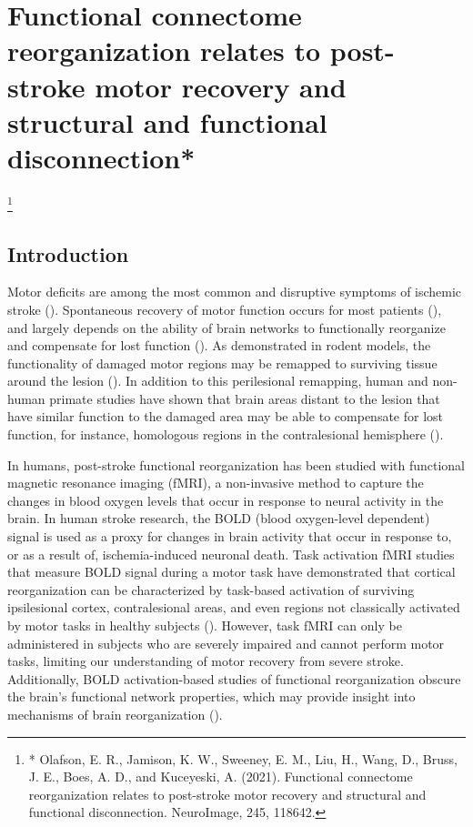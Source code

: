 \documentclass[phd,tocprelim]{cornell}
\newcommand\blfootnote[1]{%
  \begingroup
  \renewcommand\thefootnote{}\footnote{#1}%
  \addtocounter{footnote}{-1}%
  \endgroup
}
\begin{document}
\chapter{Functional connectome reorganization relates to post-stroke motor recovery and structural and functional disconnection*}
\blfootnote{* Olafson, E. R., Jamison, K. W., Sweeney, E. M., Liu, H., Wang, D., Bruss, J. E., Boes, A. D., and Kuceyeski, A. (2021). Functional connectome reorganization relates to post-stroke motor recovery and structural and functional disconnection. NeuroImage, 245, 118642.}

%
\section{Introduction}
Motor deficits are among the most common and disruptive symptoms of ischemic stroke (\cite{Kelly-Hayes2003-sp}). Spontaneous recovery of motor function occurs for most patients (\cite{Duncan2000-uj}), and largely depends on the ability of brain networks to functionally reorganize and compensate for lost function (\cite{Grefkes2008-bt, Rehme2013-ap}). As demonstrated in rodent models, the functionality of damaged motor regions may be remapped to surviving tissue around the lesion (\cite{Winship2009-af,Brown2009-jn}).  In addition to this perilesional remapping, human and non-human primate studies have shown that brain areas distant to the lesion that have similar function to the damaged area may be able to compensate for lost function, for instance, homologous regions in the contralesional hemisphere (\cite{Murata2015-ss, Ward2003-zd, Cramer1997-ko,Cao1998-iq}).  

In humans, post-stroke functional reorganization has been studied with functional magnetic resonance imaging (fMRI), a non-invasive method to capture the changes in blood oxygen levels that occur in response to neural activity in the brain. In human stroke research, the BOLD (blood oxygen-level dependent) signal is used as a proxy for changes in brain activity that occur in response to, or as a result of, ischemia-induced neuronal death. Task activation fMRI studies that measure BOLD signal during a motor task have demonstrated that cortical reorganization can be characterized by task-based activation of surviving ipsilesional cortex, contralesional areas, and even regions not classically activated by motor tasks in healthy subjects (\cite{Ward2003-zd,Park2011-kx}). However, task fMRI can only be administered in subjects who are severely impaired and cannot perform motor tasks, limiting our understanding of motor recovery from severe stroke. Additionally,  BOLD activation-based studies of functional reorganization obscure the brain's functional network properties, which may provide insight into mechanisms of brain reorganization (\cite{Griffis2019-cy}).
 
\end{document}
